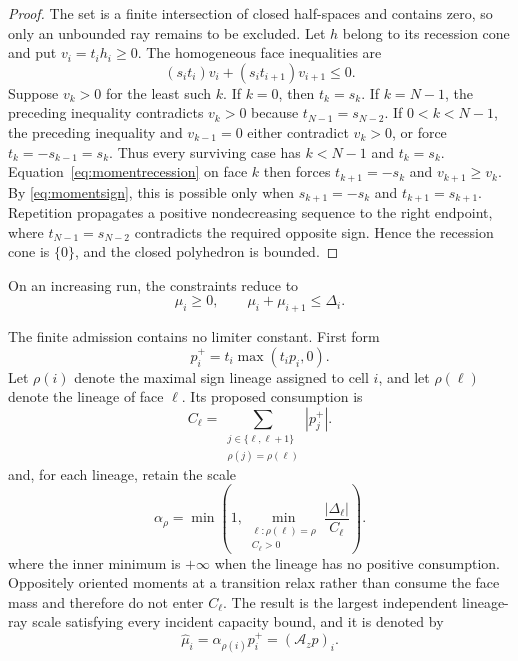\documentclass[journal]{IEEEtran}
\newcommand{\Acal}{\mathcal{A}}
\begin{document}
\begin{proof}
The set is a finite intersection of closed half-spaces and contains zero, so
only an unbounded ray remains to be excluded. Let \(h\) belong to its
recession cone and put \(v_i=t_ih_i\geq0\). The homogeneous face inequalities
are
\begin{equation}
 (s_it_i)v_i+(s_it_{i+1})v_{i+1}\leq0.
 \label{eq:momentrecession}
\end{equation}
Suppose \(v_k>0\) for the least such \(k\). If \(k=0\), then \(t_k=s_k\).
If \(k=N-1\), the preceding inequality contradicts \(v_k>0\) because
\(t_{N-1}=s_{N-2}\). If \(0<k<N-1\), the preceding inequality and
\(v_{k-1}=0\) either contradict \(v_k>0\), or force
\(t_k=-s_{k-1}=s_k\). Thus every surviving case has \(k<N-1\) and
\(t_k=s_k\). Equation~\eqref{eq:momentrecession} on face \(k\) then forces
\(t_{k+1}=-s_k\) and \(v_{k+1}\geq v_k\). By
\eqref{eq:momentsign}, this is possible only when
\(s_{k+1}=-s_k\) and \(t_{k+1}=s_{k+1}\). Repetition propagates a positive
nondecreasing sequence to the right endpoint, where
\(t_{N-1}=s_{N-2}\) contradicts the required opposite sign. Hence the
recession cone is \(\{0\}\), and the closed polyhedron is bounded.
\end{proof}

On an increasing run, the constraints reduce to
\begin{equation}
 \mu_i\geq0,\qquad \mu_i+\mu_{i+1}\leq\Delta_i.
 \label{eq:monotonemoment}
\end{equation}

The finite admission contains no limiter constant. First form
\begin{equation}
p_i^+=t_i\max(t_ip_i,0).
 \label{eq:momentorthant}
\end{equation}
Let \(\rho(i)\) denote the maximal sign lineage assigned to cell \(i\), and
let \(\rho(\ell)\) denote the lineage of face \(\ell\). Its proposed
consumption is
\begin{equation}
 C_\ell=\sum_{\substack{j\in\{\ell,\ell+1\}\\
                        \rho(j)=\rho(\ell)}}|p_j^+|.
 \label{eq:momentconsumption}
\end{equation}
and, for each lineage, retain the scale
\begin{equation}
\alpha_\rho=\min\left(
 1,\min_{\substack{\ell:\rho(\ell)=\rho\\C_\ell>0}}
 \frac{|\Delta_\ell|}{C_\ell}\right).
 \label{eq:momentrayscale}
\end{equation}
where the inner minimum is \(+\infty\) when the lineage has no positive
consumption. Oppositely oriented moments at a transition relax rather than
consume the face mass and therefore do not enter \(C_\ell\). The result is the
largest independent lineage-ray scale satisfying every incident capacity
bound, and it is denoted by
\begin{equation}
 \widehat\mu_i=\alpha_{\rho(i)}p_i^+=(\Acal_zp)_i.
 \label{eq:momentadmission}
\end{equation}
\end{document}

